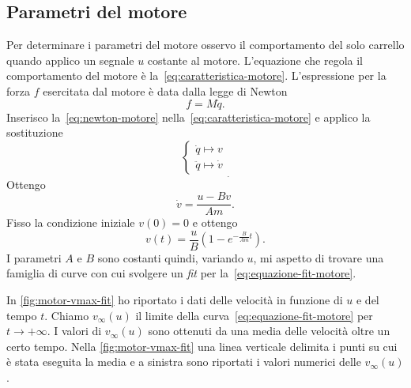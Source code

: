 \subsection{Parametri del motore}
\label{subsec:parametri-motore}
Per determinare i parametri del motore osservo il comportamento del solo
carrello quando applico un segnale $u$ costante al motore.
L'equazione che regola il comportamento del motore è la~\eqref{eq:caratteristica-motore}.
L'espressione per la forza $f$
esercitata dal motore è data dalla legge di Newton
\begin{equation}
    f = M \ddot q.
    \label{eq:newton-motore}
\end{equation}
Inserisco la~\eqref{eq:newton-motore} nella~\eqref{eq:caratteristica-motore}
e applico la sostituzione
\begin{equation*}
    \left\{
    \begin{aligned}
        \dot q \mapsto v \\
        \ddot q \mapsto \dot v
    \end{aligned}
    \right.
    _.
    \label{eq:sostituzione-motore}
\end{equation*}
Ottengo
\begin{equation*}
    \dot v = \frac{u - B v} {Am}.
\end{equation*}
Fisso la condizione iniziale $v(0) = 0$ e ottengo
\begin{equation}
    v(t) = \frac u B \left(1 - e^{-\frac B {Am} t}\right).
    \label{eq:equazione-fit-motore}
\end{equation}
I parametri $A$ e $B$ sono costanti quindi, variando $u$, mi aspetto di trovare
una famiglia di curve con cui svolgere un \emph{fit} per la~\eqref{eq:equazione-fit-motore}.

In \autoref{fig:motor-vmax-fit} ho riportato i dati delle velocità in funzione di
$u$ e del tempo $t$.
Chiamo $v_\infty(u)$ il limite della
curva~\eqref{eq:equazione-fit-motore} per $t \to +\infty$.
I valori di
$v_\infty(u)$ sono ottenuti da una media delle velocità oltre un certo tempo.
Nella \autoref{fig:motor-vmax-fit} una linea verticale delimita i punti su cui è
stata eseguita la media e a sinistra sono riportati i valori numerici delle $v_\infty(u)$.

